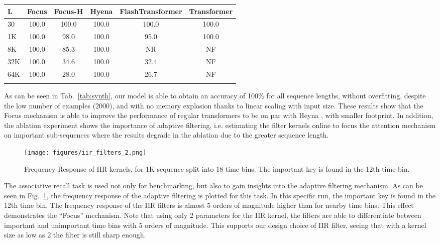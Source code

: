 \documentclass[11pt]{article}
\begin{document}
\begin{table*}[t]
\centering
\caption{Test accuracy (\%) for associative recall on long sequences of length  and a vocabulary size of 30. NF - not feasible to test. NR = not reported. }\begin{tabular}{lccccc}\toprule
L & Focus & Focus-H&Hyena &FlashTransformer &Transformer \\
\midrule
30 & 100.0 & 100.0 & 100.0 & 100.0 & 100.0\\
1K & 100.0 & 98.0 & 100.0& 95.0&100.0\\
8K & 100.0 & 85.3& 100.0 &NR& NF\\
32K & 100.0& 34.6&100.0 & 32.4& NF\\
64K & 100.0& 28.0&100.0 & 26.7 & NF\\
\bottomrule
\label{tab:synth}
\end{tabular}
\end{table*}

As can be seen in Tab.~\ref{tab:synth}, our model is able to obtain an accuracy of 100\% for all sequence lengths, without overfitting, despite the low number of examples (2000), and with no memory explosion thanks to linear scaling with input size. These results show that the Focus mechanism is able to improve the performance of regular transformers to be on par with Heyna \cite{poli2023hyena}, with smaller footprint.
In addition, the ablation experiment shows the importance of adaptive filtering, i.e. estimating the filter kernels online to focus the attention mechanism on important sub-sequences where the results degrade in the ablation due to the greater sequence length.
\begin{figure}[t]
    \centering
\texttt{[image: figures/iir\_filters\_2.png]}
    \caption{Frequency Response of IIR kernels, for 1K sequence split into 18 time bins. The important key is found in the 12th time bin.}
    \label{fig:Focusing_Effect}
\end{figure}

The associative recall task is used not only for benchmarking, but also to gain insights into the adaptive filtering mechanism.
As can be seen in Fig.~\ref{fig:Focusing_Effect}, the frequency response of the adaptive filtering is plotted for this task. In this specific run, the important key is found in the 12th time bin. The frequency response of the IIR filters is almost 5 orders of magnitude higher than for nearby time bins. This effect demonstrates the ``Focus'' mechanism. Note that using only 2 parameters for the IIR kernel, the filters are able to differentiate between important and unimportant time bins with 5 orders of magnitude. This supports our design choice of IIR filter, seeing that with a kernel size as low as 2 the filter is still sharp enough.
\end{document}
